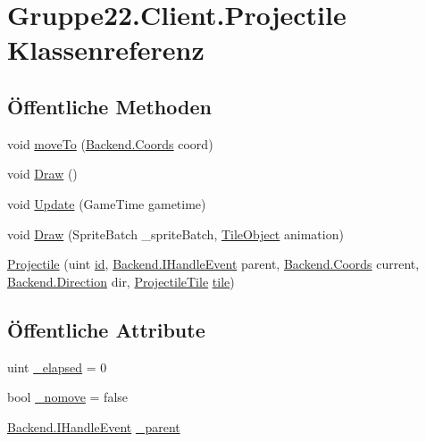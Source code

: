 \hypertarget{class_gruppe22_1_1_client_1_1_projectile}{\section{Gruppe22.\-Client.\-Projectile Klassenreferenz}
\label{class_gruppe22_1_1_client_1_1_projectile}
}
\subsection*{Öffentliche Methoden}
\begin{DoxyCompactItemize}
\item 
void \hyperlink{class_gruppe22_1_1_client_1_1_projectile_a754c50d48c5c1667691fa494d20a0583}{move\-To} (\hyperlink{class_gruppe22_1_1_backend_1_1_coords}{Backend.\-Coords} coord)
\item 
void \hyperlink{class_gruppe22_1_1_client_1_1_projectile_a9870a8bba637e177cfd60a8ed363f542}{Draw} ()
\item 
void \hyperlink{class_gruppe22_1_1_client_1_1_projectile_a37ff55bb3fd3fb071c1a4a7a1262e25d}{Update} (Game\-Time gametime)
\item 
void \hyperlink{class_gruppe22_1_1_client_1_1_projectile_addca7438b89e11199d66ffbdb4d201b6}{Draw} (Sprite\-Batch \-\_\-sprite\-Batch, \hyperlink{class_gruppe22_1_1_client_1_1_tile_object}{Tile\-Object} animation)
\item 
\hyperlink{class_gruppe22_1_1_client_1_1_projectile_a462e1a1ed97ee8a68cc59f931ac721f0}{Projectile} (uint \hyperlink{class_gruppe22_1_1_client_1_1_projectile_ab29686eea9206ed8e87f1d65ec1c9993}{id}, \hyperlink{interface_gruppe22_1_1_backend_1_1_i_handle_event}{Backend.\-I\-Handle\-Event} parent, \hyperlink{class_gruppe22_1_1_backend_1_1_coords}{Backend.\-Coords} current, \hyperlink{namespace_gruppe22_1_1_backend_a2d53d5d14b8ea0951ba6971e5da1ebf5}{Backend.\-Direction} dir, \hyperlink{class_gruppe22_1_1_projectile_tile}{Projectile\-Tile} \hyperlink{class_gruppe22_1_1_client_1_1_projectile_a4f6302a03a806ca00bce450bb715d405}{tile})
\end{DoxyCompactItemize}
\subsection*{Öffentliche Attribute}
\begin{DoxyCompactItemize}
\item 
uint \hyperlink{class_gruppe22_1_1_client_1_1_projectile_a5ca3b8028011f80a8c631abe434cc1c9}{\-\_\-elapsed} = 0
\item 
bool \hyperlink{class_gruppe22_1_1_client_1_1_projectile_a971577dac5c8af89967628cfc571223e}{\-\_\-nomove} = false
\item 
\hyperlink{interface_gruppe22_1_1_backend_1_1_i_handle_event}{Backend.\-I\-Handle\-Event} \hyperlink{class_gruppe22_1_1_client_1_1_projectile_a7fd18cd246a687bde87f648ff8bfabca}{\-\_\-parent}
\end{DoxyCompactItemize}
